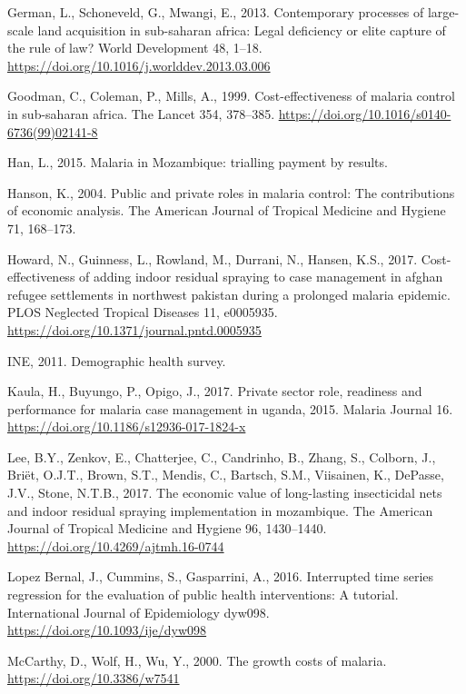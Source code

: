 \documentclass[]{article}
\begin{document}
\hypertarget{ref-German2013}{}
German, L., Schoneveld, G., Mwangi, E., 2013. Contemporary processes of
large-scale land acquisition in sub-saharan africa: Legal deficiency or
elite capture of the rule of law? World Development 48, 1--18.
\url{https://doi.org/10.1016/j.worlddev.2013.03.006}

\hypertarget{ref-Goodman1999}{}
Goodman, C., Coleman, P., Mills, A., 1999. Cost-effectiveness of malaria
control in sub-saharan africa. The Lancet 354, 378--385.
\url{https://doi.org/10.1016/s0140-6736(99)02141-8}

\hypertarget{ref-Han}{}
Han, L., 2015. Malaria in Mozambique: trialling payment by results.

\hypertarget{ref-Hanson2004}{}
Hanson, K., 2004. Public and private roles in malaria control: The
contributions of economic analysis. The American Journal of Tropical
Medicine and Hygiene 71, 168--173.

\hypertarget{ref-Howard_2017}{}
Howard, N., Guinness, L., Rowland, M., Durrani, N., Hansen, K.S., 2017.
Cost-effectiveness of adding indoor residual spraying to case management
in afghan refugee settlements in northwest pakistan during a prolonged
malaria epidemic. PLOS Neglected Tropical Diseases 11, e0005935.
\url{https://doi.org/10.1371/journal.pntd.0005935}

\hypertarget{ref-estatistica2009}{}
INE, 2011. Demographic health survey.

\hypertarget{ref-Kaula_2017}{}
Kaula, H., Buyungo, P., Opigo, J., 2017. Private sector role, readiness
and performance for malaria case management in uganda, 2015. Malaria
Journal 16. \url{https://doi.org/10.1186/s12936-017-1824-x}

\hypertarget{ref-Lee2017}{}
Lee, B.Y., Zenkov, E., Chatterjee, C., Candrinho, B., Zhang, S.,
Colborn, J., Briët, O.J.T., Brown, S.T., Mendis, C., Bartsch, S.M.,
Viisainen, K., DePasse, J.V., Stone, N.T.B., 2017. The economic value of
long-lasting insecticidal nets and indoor residual spraying
implementation in mozambique. The American Journal of Tropical Medicine
and Hygiene 96, 1430--1440. \url{https://doi.org/10.4269/ajtmh.16-0744}

\hypertarget{ref-Lopez_Bernal_2016}{}
Lopez Bernal, J., Cummins, S., Gasparrini, A., 2016. Interrupted time
series regression for the evaluation of public health interventions: A
tutorial. International Journal of Epidemiology dyw098.
\url{https://doi.org/10.1093/ije/dyw098}

\hypertarget{ref-McCarthy_2000}{}
McCarthy, D., Wolf, H., Wu, Y., 2000. The growth costs of malaria.
\url{https://doi.org/10.3386/w7541}
\end{document}

